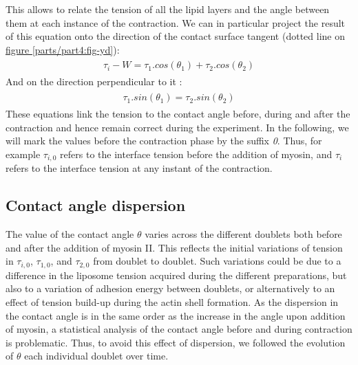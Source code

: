 \documentclass[A4paperpaper,11pt,english]{sphinxmanual}
\begin{document}
This allows
to relate the tension of all the lipid layers and the angle
between them at each instance of the contraction. We can in particular project
the result of this equation onto the direction of the contact surface
tangent (dotted line on \hyperref[parts/part4:fig-yd]{figure  \ref*{parts/part4:fig-yd}}):
\label{parts/part4:equation-young-tangent}\begin{gather}
\begin{split}\tau_i - W = \tau_1.cos(\theta_1) + \tau_2.cos(\theta_2)\end{split}\label{parts/part4-young-tangent}
\end{gather}
And on the direction perpendicular to it :
\label{parts/part4:equation-young-perpendicular}\begin{gather}
\begin{split} \tau_1.sin(\theta_1) = \tau_2.sin(\theta_2)\end{split}\label{parts/part4-young-perpendicular}
\end{gather}
These equations link the tension to the contact angle before, during and
after the contraction and hence remain correct during the experiment. In the following, we will mark the values
before the contraction phase by
the suffix \emph{0}. Thus, for example \(\tau_{i,0}\) refers to the
interface tension before the addition of myosin, and \(\tau_i\) refers to the
interface tension at any instant of the contraction.


\subsection{Contact angle dispersion}
\label{parts/part4:contact-angle-dispersion}
The value of the contact angle \(\theta\) varies across the different doublets both before
and after the  addition of myosin II. This reflects the initial variations of tension in
\(\tau_{i,0}\), \(\tau_{1,0}\), and \(\tau_{2,0}\) from doublet to doublet. Such variations could be
due to a difference in the liposome tension acquired during the different preparations, but also to a
variation of adhesion energy between doublets, or alternatively to an effect of tension build-up
during the actin shell formation. As the dispersion in the contact angle is
in the same order as the increase in the angle upon addition of myosin, a
statistical analysis of the contact angle before and during contraction is
problematic. Thus, to avoid this effect of dispersion, we followed the evolution of
\(\theta\) each individual doublet over time.
\end{document}
